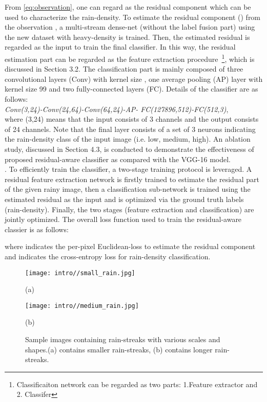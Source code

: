 \documentclass[10pt,twocolumn,letterpaper]{article}
\begin{document}
From \eqref{eq:observation}, one can regard  as the residual component which can be used to characterize the rain-density.   To estimate the residual component () from the observation ,  a multi-stream dense-net (without the label fusion part) using the new dataset with heavy-density is trained.  Then, the estimated residual is regarded as the input to train the final classifier.  In this way, the residual estimation part can be regarded as the feature extraction procedure~\footnote{Classificaiton network can be regarded as two parts: 1.Feature extractor and 2. Classifer}, which is discussed in Section 3.2.  The classification part is mainly composed of three convolutional layers (Conv) with kernel size , one average pooling (AP) layer with kernel size 99 and  two fully-connected layers (FC).  Details of the classifier are as follows:\\
\emph{Conv(3,24)-Conv(24,64)-Conv(64,24)-AP- FC(127896,512)-FC(512,3)},\\
where (3,24) means that the input consists of 3 channels and the output consists of 24 channels.  Note that the final layer  consists  of  a  set  of  3  neurons indicating  the  rain-density  class
of  the  input  image (i.e. low, medium, high). An ablation study, discussed in Section 4.3, is conducted to demonstrate the effectiveness of proposed residual-aware classifier as compared with the VGG-16 \cite{vgg} model.
\\





. To efficiently train the classifier, a two-stage training protocol is leveraged. A residual  feature extraction network is firstly trained to estimate the residual part of the given rainy image, then a classification sub-network is trained using the estimated residual as the input and is optimized via the ground truth labels (rain-density). Finally, the two stages (feature extraction and classification) are jointly optimized. The overall loss function used to train the residual-aware classier is as follows:  
 
where  indicates the per-pixel Euclidean-loss to estimate the residual component and  indicates the cross-entropy loss for rain-density classification.
 
\begin{figure}[t]
	\centering
	\begin{minipage}{.23\textwidth}
		\centering
		\texttt{[image: intro//small\_rain.jpg]}
		\captionsetup{labelformat=empty}
		\captionsetup{justification=centering}
		\caption*{(a)}
\end{minipage}
	\begin{minipage}{.23\textwidth}
		\centering
		\texttt{[image: intro//medium\_rain.jpg]}
		\captionsetup{labelformat=empty}
		\captionsetup{justification=centering}
    	\caption*{(b)}
\end{minipage}	
		\vskip-10pt \caption{Sample images containing rain-streaks with various scales and shapes.(a) contains smaller rain-streaks, (b) contains longer rain-streaks.} \label{fig:moti_scale}
\end{figure} 
\end{document}
